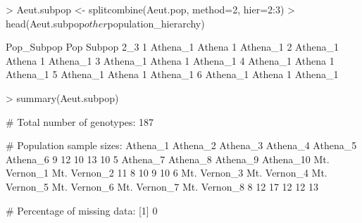 \documentclass[letterpaper]{article}
\begin{document}
\begin{Schunk}
\begin{Sinput}
> Aeut.subpop <- splitcombine(Aeut.pop, method=2, hier=2:3)
> head(Aeut.subpop$other$population_hierarchy)
\end{Sinput}
\begin{Soutput}
  Pop_Subpop    Pop Subpop      2_3
1   Athena_1 Athena      1 Athena_1
2   Athena_1 Athena      1 Athena_1
3   Athena_1 Athena      1 Athena_1
4   Athena_1 Athena      1 Athena_1
5   Athena_1 Athena      1 Athena_1
6   Athena_1 Athena      1 Athena_1
\end{Soutput}
\begin{Sinput}
> summary(Aeut.subpop)
\end{Sinput}
\begin{Soutput}
 # Total number of genotypes:  187 

 # Population sample sizes:  
    Athena_1     Athena_2     Athena_3     Athena_4     Athena_5     Athena_6 
           9           12           10           13           10            5 
    Athena_7     Athena_8     Athena_9    Athena_10 Mt. Vernon_1 Mt. Vernon_2 
          11            8           10            9           10            6 
Mt. Vernon_3 Mt. Vernon_4 Mt. Vernon_5 Mt. Vernon_6 Mt. Vernon_7 Mt. Vernon_8 
           8           12           17           12           12           13 

 # Percentage of missing data:  
[1] 0
\end{Soutput}
\end{Schunk}
\end{document}
